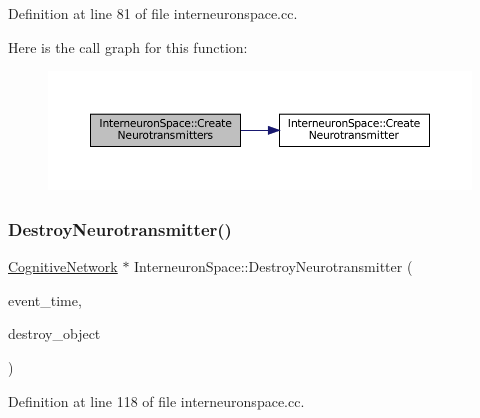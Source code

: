 Definition at line 81 of file interneuronspace.\+cc.

Here is the call graph for this function\+:\nopagebreak
\begin{figure}[H]
\begin{center}
\leavevmode
\includegraphics[width=350pt]{class_interneuron_space_af69f7190226d77a30a80d66d7c28e0ba_cgraph}
\end{center}
\end{figure}
\mbox{\label{class_interneuron_space_a41eb332165b0a67c3549bd73a8faa969}} 
\subsubsection{\texorpdfstring{Destroy\+Neurotransmitter()}{DestroyNeurotransmitter()}}
{\footnotesize\ttfamily \mbox{\hyperlink{class_cognitive_network}{Cognitive\+Network}} $\ast$ Interneuron\+Space\+::\+Destroy\+Neurotransmitter (\begin{DoxyParamCaption}\item[{std\+::chrono\+::time\+\_\+point$<$ \mbox{\hyperlink{universe_8h_a0ef8d951d1ca5ab3cfaf7ab4c7a6fd80}{Clock}} $>$}]{event\+\_\+time,  }\item[{\mbox{\hyperlink{class_cognitive_network}{Cognitive\+Network}} $\ast$}]{destroy\+\_\+object }\end{DoxyParamCaption})}



Definition at line 118 of file interneuronspace.\+cc.

\mbox{\label{class_interneuron_space_a9543932ffea18cce46fdfbf0fbb85b1b}} 
